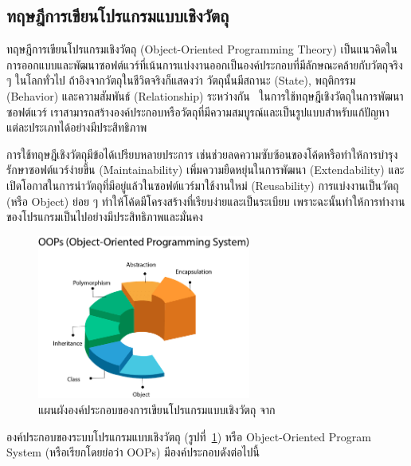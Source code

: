 \documentclass[12pt,one side,openright,a4paper]{cpe-thesis-th}
\newcommand{\thaijustify}[1]{%
  \par\hspace{30pt}\justifying
  #1
}
\begin{document}
    \subsection{ทฤษฎีการเขียนโปรแกรมแบบเชิงวัตถุ}
        \thaijustify{
            ทฤษฎีการเขียนโปรแกรมเชิงวัตถุ (Object-Oriented Programming Theory) เป็นแนวคิดในการออกแบบและพัฒนาซอฟต์แวร์ที่เน้นการแบ่งงานออกเป็นองค์ประกอบที่มีลักษณะคล้ายกับวัตถุจริง ๆ ในโลกทั่วไป ถ้าอิงจากวัตถุในชีวิตจริงก็แสดงว่า วัตถุนั้นมีสถานะ (State), พฤติกรรม (Behavior) และความสัมพันธ์ (Relationship) ระหว่างกัน~\cite{booch87} ในการใช้ทฤษฎีเชิงวัตถุในการพัฒนาซอฟต์แวร์ เราสามารถสร้างองค์ประกอบหรือวัตถุที่มีความสมบูรณ์และเป็นรูปแบบสำหรับแก้ปัญหาแต่ละประเภทได้อย่างมีประสิทธิภาพ~\cite{meyer2000}
        }
        \thaijustify{
            การใช้ทฤษฎีเชิงวัตถุมีข้อได้เปรียบหลายประการ เช่นช่วยลดความซับซ้อนของโค้ดหรือทำให้การบำรุงรักษาซอฟต์แวร์ง่ายขึ้น (Maintainability) เพิ่มความยืดหยุ่นในการพัฒนา (Extendability) และเปิดโอกาสในการนำวัตถุที่มีอยู่แล้วในซอฟต์แวร์มาใช้งานใหม่ (Reusability) การแบ่งงานเป็นวัตถุ (หรือ Object) ย่อย ๆ ทำให้โค้ดมีโครงสร้างที่เรียบง่ายและเป็นระเบียบ เพราะฉะนั้นทำให้การทำงานของโปรแกรมเป็นไปอย่างมีประสิทธิภาพและมั่นคง~\cite{meyer2000}
        }
        \begin{figure}[H]
            \centering
            \includegraphics[width=7cm]{figure/literature/oop-programming.png}
            \caption[แผนผังองค์ประกอบของ OOPs]{แผนผังองค์ประกอบของการเขียนโปรแกรมแบบเชิงวัตถุ จาก~\cite{apollo22oop}}
            \label{fig:oop-concept}
        \end{figure}
        \thaijustify{
            องค์ประกอบของระบบโปรแกรมแบบเชิงวัตถุ (รูปที่~\ref{fig:oop-concept}) หรือ Object-Oriented Program System (หรือเรียกโดยย่อว่า OOPs) มีองค์ประกอบดังต่อไปนี้ 
        }
\end{document}
